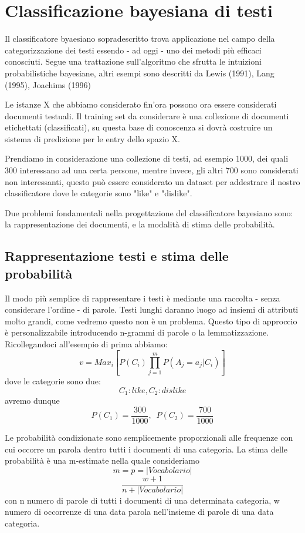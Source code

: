 \documentclass{article}
\theoremstyle{plain}
\theoremstyle{definition}
\begin{document}
\section{Classificazione bayesiana di testi }
Il classificatore byaesiano sopradescritto trova applicazione nel campo della categorizzazione dei testi essendo - ad oggi - uno dei metodi più efficaci conosciuti.
Segue una trattazione sull'algoritmo che sfrutta le intuizioni probabilistiche bayesiane, altri esempi sono descritti da Lewis (1991), Lang (1995), Joachims (1996)\footnotemark
{}

Le istanze X che abbiamo considerato fin'ora possono ora essere considerati documenti testuali. Il training set da considerare è una collezione di documenti etichettati (classificati), su questa base di conoscenza si dovrà costruire un sistema di predizione per le entry dello spazio X.

Prendiamo in considerazione una collezione di testi, ad esempio 1000, dei quali 300 interessano ad una certa persone, mentre invece, gli altri 700 sono considerati non interessanti, questo può essere considerato un dataset per addestrare il nostro classificatore dove le categorie sono "like" e "dislike".

Due problemi fondamentali nella progettazione del classificatore bayesiano sono: la rappresentazione dei documenti, e la modalità di stima delle probabilità.

\subsection{Rappresentazione testi e stima delle probabilità}
Il modo più semplice di rappresentare i testi è mediante una raccolta - senza considerare l'ordine - di parole. Testi lunghi daranno luogo ad insiemi di attributi molto grandi, come vedremo questo non è un problema. Questo tipo di approccio è personalizzabile introducendo n-grammi di parole o la lemmatizzazione.
Ricollegandoci all'esempio di prima abbiamo: 
$$v=Max_i [P(C_i)\prod_{j=1}^m P(A_j=a_j|C_i)]$$
dove le categorie sono due: $$C_1:like, C_2:dislike$$
avremo dunque $$P(C_1)=\frac{300}{1000},\,\,\, P(C_2)=\frac{700}{1000}$$

Le probabilità condizionate sono semplicemente proporzionali alle frequenze con cui occorre un parola dentro tutti i documenti di una categoria.
La stima delle probabilità è una m-estimate nella quale consideriamo $$m=p=|Vocabolario|$$
$$\frac{w+1}{n+|Vocabolario|}$$
con n numero di parole di tutti i documenti di una determinata categoria, w numero di occorrenze di una data parola nell'insieme di parole di una data categoria.
\end{document}
